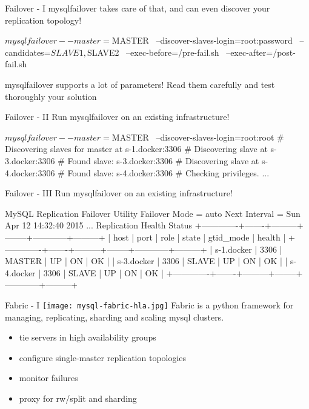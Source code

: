\documentclass{beamer}[10]
\begin{document}
\begin{pyframe}{Failover - I}
mysqlfailover takes care of that, and can even discover your
replication topology!

\begin{bashcode}
$ mysqlfailover --master=$MASTER \
    --discover-slaves-login=root:password \
    --candidates=$SLAVE1,$SLAVE2 \
    --exec-before=/pre-fail.sh \
    --exec-after=/post-fail.sh
\end{bashcode}
{\large
    mysqlfailover supports a lot of parameters!
    Read them carefully and test thoroughly your
    solution
    }
\end{pyframe}


\begin{pyframe}{Failover - II}
Run mysqlfailover on an existing infrastructure!
\begin{bashcode}
$ mysqlfailover --master=$MASTER \
 --discover-slaves-login=root:root
# Discovering slaves for master at s-1.docker:3306
# Discovering slave at s-3.docker:3306
# Found slave: s-3.docker:3306
# Discovering slave at s-4.docker:3306
# Found slave: s-4.docker:3306
# Checking privileges.
...
\end{bashcode}
\end{pyframe}

\begin{pyframe}{Failover - III}
Run mysqlfailover on an existing infrastructure!
\iffalse
Master Information
------------------
Binary Log File  Position  Binlog_Do_DB  Binlog_Ignore_DB
s-1-bin.000009   231

GTID Executed Set
f01a69cd-df69-11e4-b908-0242ac110009:1-3 [...]
\fi
\begin{bashcode}
MySQL Replication Failover Utility
Failover Mode = auto     Next Interval = Sun Apr 12 14:32:40 2015
...
Replication Health Status
+-------------+-------+---------+--------+------------+---------+
| host        | port  | role    | state  | gtid_mode  | health  |
+-------------+-------+---------+--------+------------+---------+
| s-1.docker  | 3306  | MASTER  | UP     | ON         | OK      |
| s-3.docker  | 3306  | SLAVE   | UP     | ON         | OK      |
| s-4.docker  | 3306  | SLAVE   | UP     | ON         | OK      |
+-------------+-------+---------+--------+------------+---------+
\end{bashcode}
\end{pyframe}



%
%
\begin{pyframe}{Fabric - I}
\texttt{[image: mysql-fabric-hla.jpg]}
Fabric is a python framework for managing, replicating, sharding and scaling mysql clusters.
\begin{itemize}
\item tie servers in high availability groups
\item configure single-master replication topologies
\item monitor failures
\item proxy for rw/split and sharding
\end{itemize}
\end{pyframe}
\end{document}
